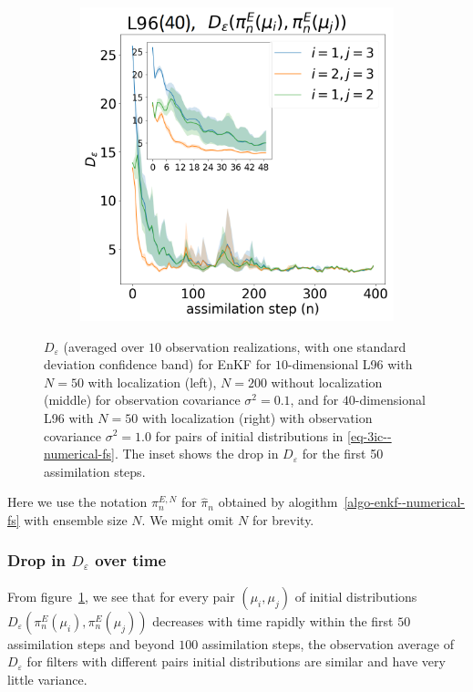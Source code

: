 \begin{figure}[!t]
\begin{subfigure}{.3\textwidth}
\end{subfigure}\hspace{0mm}%
\begin{subfigure}{.3\textwidth}
\includegraphics[width=\columnwidth]{numerical-fs/plots/figures-EnKF-stable_50_loc_L96_40dim.png}%
\end{subfigure}%
\caption{$D_\varepsilon$ (averaged over $10$ observation realizations, with one standard deviation confidence band) for EnKF for $10$-dimensional L96 with $N=50$ with localization (left), $N=200$ without localization (middle) for observation covariance $\sigma^2=0.1$, and for $40$-dimensional L96 with $N=50$ with localization (right) with observation covariance $\sigma^2=1.0$ for pairs of initial distributions in \ref{eq-3ic--numerical-fs}. The inset shows the drop in $D_\varepsilon$ for the first 50 assimilation steps.}
\label{fig:plot-enkfL96-10--numerical-fs}
\end{figure}
Here we use the notation $\pi^{E,N}_n$ for $\hat\pi_n$ obtained by alogithm~\ref{algo-enkf--numerical-fs} with ensemble size $N$. We might omit $N$ for brevity.
\subsubsection{Drop in $D_\varepsilon$ over time}
From figure~\ref{fig:plot-enkfL96-10--numerical-fs}, we see that for every pair $(\mu_i, \mu_j)$ of initial distributions $D_\varepsilon(\pi^E_n(\mu_i), \pi^E_n(\mu_j))$ decreases with time rapidly within the first $50$ assimilation steps and beyond $100$ assimilation steps, the observation average of $D_\varepsilon$ for filters with different pairs initial distributions are similar and have very little variance.
